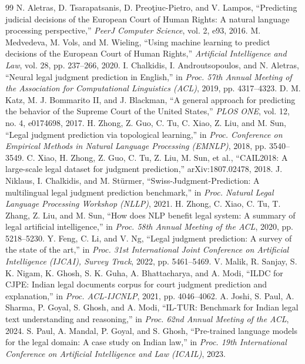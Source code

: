 \begin{thebibliography}{99}
 N. Aletras, D. Tsarapatsanis, D. Preo\c{t}iuc-Pietro, and V. Lampos, ``Predicting judicial decisions of the European Court of Human Rights: A natural language processing perspective,'' \emph{PeerJ Computer Science}, vol. 2, e93, 2016.
 M. Medvedeva, M. Vols, and M. Wieling, ``Using machine learning to predict decisions of the European Court of Human Rights,'' \emph{Artificial Intelligence and Law}, vol. 28, pp. 237--266, 2020.
 I. Chalkidis, I. Androutsopoulos, and N. Aletras, ``Neural legal judgment prediction in English,'' in \emph{Proc. 57th Annual Meeting of the Association for Computational Linguistics (ACL)}, 2019, pp. 4317--4323.
 D. M. Katz, M. J. Bommarito II, and J. Blackman, ``A general approach for predicting the behavior of the Supreme Court of the United States,'' \emph{PLOS ONE}, vol. 12, no. 4, e0174698, 2017.
 H. Zhong, Z. Guo, C. Tu, C. Xiao, Z. Liu, and M. Sun, ``Legal judgment prediction via topological learning,'' in \emph{Proc. Conference on Empirical Methods in Natural Language Processing (EMNLP)}, 2018, pp. 3540--3549.
 C. Xiao, H. Zhong, Z. Guo, C. Tu, Z. Liu, M. Sun, et al., ``CAIL2018: A large-scale legal dataset for judgment prediction,'' arXiv:1807.02478, 2018.
 J. Niklaus, I. Chalkidis, and M. St\"urmer, ``Swiss-Judgment-Prediction: A multilingual legal judgment prediction benchmark,'' in \emph{Proc. Natural Legal Language Processing Workshop (NLLP)}, 2021.
 H. Zhong, C. Xiao, C. Tu, T. Zhang, Z. Liu, and M. Sun, ``How does NLP benefit legal system: A summary of legal artificial intelligence,'' in \emph{Proc. 58th Annual Meeting of the ACL}, 2020, pp. 5218--5230.
 Y. Feng, C. Li, and V. Ng, ``Legal judgment prediction: A survey of the state of the art,'' in \emph{Proc. 31st International Joint Conference on Artificial Intelligence (IJCAI), Survey Track}, 2022, pp. 5461--5469.
 V. Malik, R. Sanjay, S. K. Nigam, K. Ghosh, S. K. Guha, A. Bhattacharya, and A. Modi, ``ILDC for CJPE: Indian legal documents corpus for court judgment prediction and explanation,'' in \emph{Proc. ACL-IJCNLP}, 2021, pp. 4046--4062.
 A. Joshi, S. Paul, A. Sharma, P. Goyal, S. Ghosh, and A. Modi, ``IL-TUR: Benchmark for Indian legal text understanding and reasoning,'' in \emph{Proc. 62nd Annual Meeting of the ACL}, 2024.
 S. Paul, A. Mandal, P. Goyal, and S. Ghosh, ``Pre-trained language models for the legal domain: A case study on Indian law,'' in \emph{Proc. 19th International Conference on Artificial Intelligence and Law (ICAIL)}, 2023.

\end{thebibliography}
